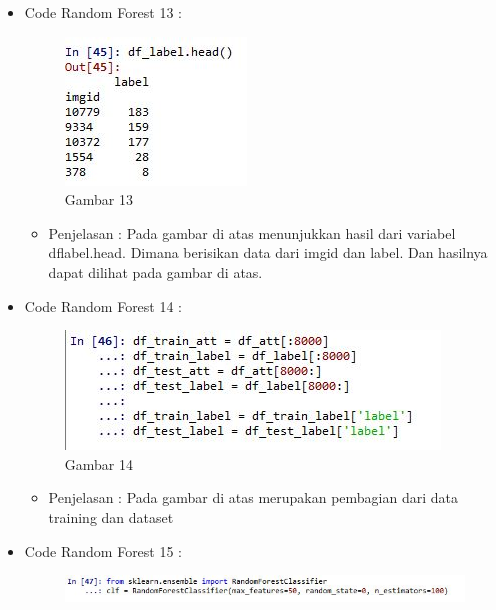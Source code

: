 \begin{enumerate}
\begin{itemize}
\begin{itemize}
\begin{itemize}
\begin{itemize}
\par
\par
\end{itemize}
\item Code Random Forest 13 :
\par
\begin{figure}[ht]
\centering
\includegraphics[scale=0.7]{figures/cod13.jpg}
\caption{Gambar 13}
\label{contoh}
\end{figure}
\par
\begin{itemize}
\item Penjelasan : Pada gambar di atas menunjukkan hasil dari variabel dflabel.head. Dimana berisikan data dari imgid dan label. Dan hasilnya dapat dilihat pada gambar di atas.
\par
\par
\end{itemize}
\item Code Random Forest 14 :
\par
\begin{figure}[ht]
\centering
\includegraphics[scale=0.7]{figures/cod14.jpg}
\caption{Gambar 14}
\label{contoh}
\end{figure}
\par
\begin{itemize}
\item Penjelasan : Pada gambar di atas merupakan pembagian dari data training dan dataset
\par
\par
\end{itemize}
\item Code Random Forest 15 :
\par
\begin{figure}[ht] 
\centering
\includegraphics[scale=0.7]{figures/cod15.jpg}

\end{figure}
\end{itemize}
\end{itemize}
\end{itemize}
\end{enumerate}
